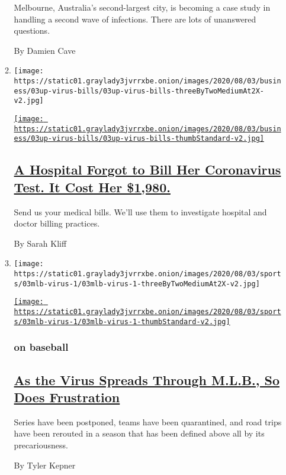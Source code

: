 \begin{enumerate}
\begin{enumerate}
    Melbourne, Australia's second-largest city, is becoming a case study
    in handling a second wave of infections. There are lots of
    unanswered questions.

    By Damien Cave
  \item
    \texttt{[image: https://static01.graylady3jvrrxbe.onion/images/2020/08/03/business/03up-virus-bills/03up-virus-bills-threeByTwoMediumAt2X-v2.jpg]}

    \href{/2020/08/03/upshot/nj-coronavirus-medical-bill.html}{\texttt{[image: https://static01.graylady3jvrrxbe.onion/images/2020/08/03/business/03up-virus-bills/03up-virus-bills-thumbStandard-v2.jpg]}}

    \hypertarget{a-hospital-forgot-to-bill-her-coronavirus-test-it-cost-her-1980}{%
    \subsection{\texorpdfstring{\href{/2020/08/03/upshot/nj-coronavirus-medical-bill.html}{A
    Hospital Forgot to Bill Her Coronavirus Test. It Cost Her
    \$1,980.}}{A Hospital Forgot to Bill Her Coronavirus Test. It Cost Her \$1,980.}}\label{a-hospital-forgot-to-bill-her-coronavirus-test-it-cost-her-1980}}

    Send us your medical bills. We'll use them to investigate hospital
    and doctor billing practices.

    By Sarah Kliff
  \item
    \texttt{[image: https://static01.graylady3jvrrxbe.onion/images/2020/08/03/sports/03mlb-virus-1/03mlb-virus-1-threeByTwoMediumAt2X-v2.jpg]}

    \href{/2020/08/03/sports/baseball/mlb-coronavirus-outbreak.html}{\texttt{[image: https://static01.graylady3jvrrxbe.onion/images/2020/08/03/sports/03mlb-virus-1/03mlb-virus-1-thumbStandard-v2.jpg]}}

    \hypertarget{on-baseball}{%
    \subsubsection{on baseball}\label{on-baseball}}

    \hypertarget{as-the-virus-spreads-through-mlb-so-does-frustration}{%
    \subsection{\texorpdfstring{\href{/2020/08/03/sports/baseball/mlb-coronavirus-outbreak.html}{As
    the Virus Spreads Through M.L.B., So Does
    Frustration}}{As the Virus Spreads Through M.L.B., So Does Frustration}}\label{as-the-virus-spreads-through-mlb-so-does-frustration}}

    Series have been postponed, teams have been quarantined, and road
    trips have been rerouted in a season that has been defined above all
    by its precariousness.

    By Tyler Kepner
  \end{enumerate}
\end{enumerate}

